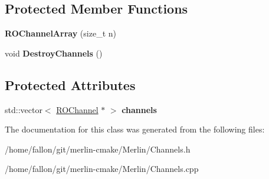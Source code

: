 \subsection*{Protected Member Functions}
\begin{DoxyCompactItemize}
\item 
\mbox{\label{classROChannelArray_a1007091833e28642d16ed404b833fec2}} 
{\bfseries R\+O\+Channel\+Array} (size\+\_\+t n)
\item 
\mbox{\label{classROChannelArray_a8e4e6279be71b14d4868463abcbc89a3}} 
void {\bfseries Destroy\+Channels} ()
\end{DoxyCompactItemize}
\subsection*{Protected Attributes}
\begin{DoxyCompactItemize}
\item 
\mbox{\label{classROChannelArray_a4acf7becc0c68bd8ecd4418b91e44ef5}} 
std\+::vector$<$ \hyperlink{classROChannel}{R\+O\+Channel} $\ast$ $>$ {\bfseries channels}
\end{DoxyCompactItemize}


The documentation for this class was generated from the following files\+:\begin{DoxyCompactItemize}
\item 
/home/fallon/git/merlin-\/cmake/\+Merlin/Channels.\+h\item 
/home/fallon/git/merlin-\/cmake/\+Merlin/Channels.\+cpp\end{DoxyCompactItemize}

